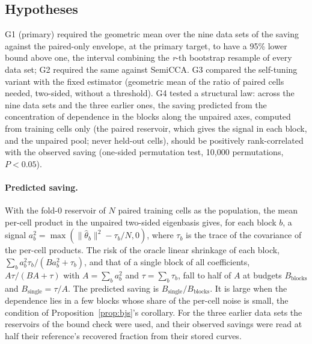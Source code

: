 \subsection*{Hypotheses}
G1 (primary) required the geometric mean over the nine data sets of the saving against the paired-only envelope, at the primary target, to have a 95\% lower bound above one, the interval combining the \textit{r}-th bootstrap resample of every data set; G2 required the same against SemiCCA. G3 compared the self-tuning variant with the fixed estimator (geometric mean of the ratio of paired cells needed, two-sided, without a threshold). G4 tested a structural law: across the nine data sets and the three earlier ones, the saving predicted from the concentration of dependence in the blocks along the unpaired axes, computed from training cells only (the paired reservoir, which gives the signal in each block, and the unpaired pool; never held-out cells), should be positively rank-correlated with the observed saving (one-sided permutation test, 10,000 permutations, $P<0.05$).

\paragraph{Predicted saving.} With the fold-0 reservoir of $N$ paired training cells as the population, the mean per-cell product in the unpaired two-sided eigenbasis gives, for each block $b$, a signal $a_b^2=\max(\|\hat\theta_b\|^2-\tau_b/N,0)$, where $\tau_b$ is the trace of the covariance of the per-cell products. The risk of the oracle linear shrinkage of each block, $\sum_ba_b^2\tau_b/(Ba_b^2+\tau_b)$, and that of a single block of all coefficients, $A\tau/(BA+\tau)$ with $A=\sum_ba_b^2$ and $\tau=\sum_b\tau_b$, fall to half of $A$ at budgets $B_{\mathrm{blocks}}$ and $B_{\mathrm{single}}=\tau/A$. The predicted saving is $B_{\mathrm{single}}/B_{\mathrm{blocks}}$. It is large when the dependence lies in a few blocks whose share of the per-cell noise is small, the condition of Proposition~\ref{prop:bjs}'s corollary. For the three earlier data sets the reservoirs of the bound check were used, and their observed savings were read at half their reference's recovered fraction from their stored curves.

